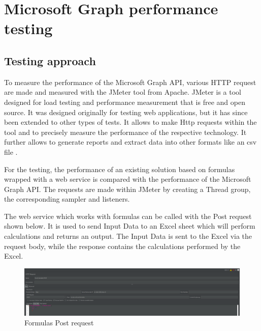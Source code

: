 
\chapter{Microsoft Graph performance testing} %

\label{Chapter3} %


\section{Testing approach}

To measure the performance of the Microsoft Graph API, various HTTP request are made and measured with the JMeter tool from Apache. JMeter is a tool designed for load testing and performance measurement that is free and open source. It was designed originally for testing web applications, but it has since been extended to other types of tests. It allows to make Http requests within the tool and to precisely measure the performance of the respective technology. It further allows to generate reports and extract data into other formats like an csv file \cite{JMeter}.

For the testing, the performance of an existing solution based on formulas wrapped with a web service is compared with the performance of the Microsoft Graph API. The requests are made within JMeter by creating a Thread group, the corresponding sampler and listeners. 

The web service which works with formulas can be called with the Post request shown below. It is used to send Input Data to an Excel sheet which will perform calculations and returns an output. The Input Data is sent to the Excel via the request body, while the response contains the calculations performed by the Excel.

\begin{figure}[h!]
  \includegraphics[scale=0.5]{Report/Figures/Formulas Post Request.png}
  \caption{Formulas Post request}
  \label{fig:App registration process}
\end{figure}

